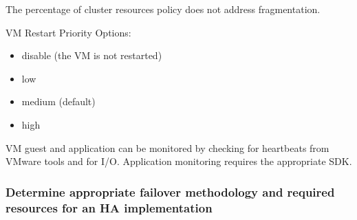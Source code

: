 The percentage of cluster resources policy does not address fragmentation.

VM Restart Priority Options:

\begin{itemize}
\item disable (the VM is not restarted)
\item low
\item medium (default)
\item high
\end{itemize}

VM guest and application can be monitored by checking for heartbeats from
VMware tools and for I/O. Application monitoring requires the appropriate SDK.

\subsubsection{Determine appropriate failover methodology and required resources for an HA implementation}
